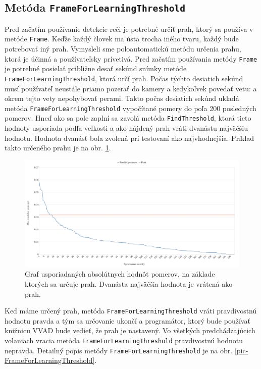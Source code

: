 \subsection{Metóda \texttt{Fra\-me\-For\-Lear\-ning\-Threshold}}
Pred začatím používanie detekcie reči je potrebné určiť prah, ktorý sa používa v metóde  \texttt{Frame}. 
Keďže každý človek ma ústa trocha iného tvaru, každý bude potrebovať iný prah.
Vymysleli sme poloautomatickú metódu určenia prahu, ktorá je účinná a používateľsky prívetivá.
Pred začatím používania metódy \texttt{Frame} je potrebné posielať približne desať sekúnd snímky metóde  \texttt{Fra\-me\-For\-Lear\-ning\-Threshold}, ktorá určí prah. 
Počas týchto desiatich sekúnd musí používateľ neustále priamo pozerať do kamery a kedykoľvek povedať vetu:  a okrem tejto vety nepohybovať perami.
Takto počas desiatich sekúnd ukladá metóda  \texttt{Fra\-me\-For\-Lear\-ning\-Threshold} vypočítané pomery do poľa 200 posledných pomerov.
Hneď ako sa pole zaplní sa zavolá metóda \texttt{FindThreshold}, ktorá tieto hodnoty usporiada podľa veľkosti a ako nájdený prah vráti dvanástu najväčšiu hodnotu.
Hodnota dvanásť bola zvolená pri testovaní ako najvhodnejšia.
Príklad takto určeného prahu je na obr. \ref{pic-kalibraciaUsporiadane}.

\begin{figure}[H]
	\begin{center}
		\includegraphics[width=\textwidth]{pics/kalibraciaUsporiadane.png}
		\caption{Graf usporiadaných absolútnych hodnôt pomerov, na základe ktorých sa určuje prah. Dvanásta najväčšia hodnota je vrátená ako prah.}
		\label{pic-kalibraciaUsporiadane}
	\end{center}
\end{figure}

Keď máme určený prah, metóda \texttt{Fra\-me\-For\-Lear\-ning\-Threshold} vráti pravdivostnú hodnotu pravda a tým sa určovanie ukončí a programátor, ktorý bude používať knižnicu VVAD bude vedieť, že prah je nastavený.
Vo všetkých predchádzajúcich volaniach vracia metóda \texttt{Fra\-me\-For\-Lear\-ning\-Threshold} pravdivostnú hodnotu nepravda.
Detailný popis metódy \texttt{Fra\-me\-For\-Lear\-ning\-Threshold} je na obr. \ref{pic-FrameForLearningThreshold}.

